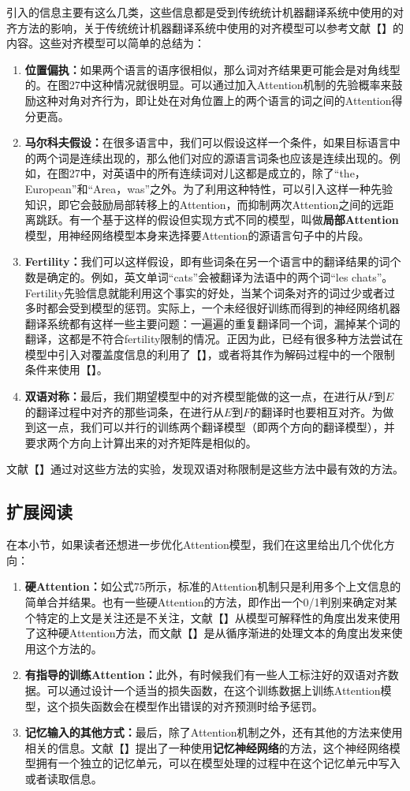 \documentclass[10pt,a4paper]{ctexart}
\begin{document}
引入的信息主要有这么几类，这些信息都是受到传统统计机器翻译系统中使用的对齐方法的影响，关于传统统计机器翻译系统中使用的对齐模型可以参考文献【】的内容。这些对齐模型可以简单的总结为：
\begin{enumerate}
\item[] \textbf{位置偏执：}如果两个语言的语序很相似，那么词对齐结果更可能会是对角线型的。在图27中这种情况就很明显。可以通过加入Attention机制的先验概率来鼓励这种对角对齐行为，即让处在对角位置上的两个语言的词之间的Attention得分更高。
\item[] \textbf{马尔科夫假设：}在很多语言中，我们可以假设这样一个条件，如果目标语言中的两个词是连续出现的，那么他们对应的源语言词条也应该是连续出现的。例如，在图27中，对英语中的所有连续词对儿这都是成立的，除了“the，European”和“Area，was”之外。为了利用这种特性，可以引入这样一种先验知识，即它会鼓励局部转移上的Attention，而抑制两次Attention之间的远距离跳跃。有一个基于这样的假设但实现方式不同的模型，叫做\textbf{局部Attention}模型，用神经网络模型本身来选择要Attention的源语言句子中的片段。
\item[] \textbf{Fertility：}我们可以这样假设，即有些词条在另一个语言中的翻译结果的词个数是确定的。例如，英文单词“cats”会被翻译为法语中的两个词“les chats”。Fertility先验信息就能利用这个事实的好处，当某个词条对齐的词过少或者过多时都会受到模型的惩罚。实际上，一个未经很好训练而得到的神经网络机器翻译系统都有这样一些主要问题：一遍遍的重复翻译同一个词，漏掉某个词的翻译，这都是不符合fertility限制的情况。正因为此，已经有很多种方法尝试在模型中引入对覆盖度信息的利用了【】，或者将其作为解码过程中的一个限制条件来使用【】。
\item[] \textbf{双语对称：}最后，我们期望模型中的对齐模型能做的这一点，在进行从$F$到$E$的翻译过程中对齐的那些词条，在进行从$E$到$F$的翻译时也要相互对齐。为做到这一点，我们可以并行的训练两个翻译模型（即两个方向的翻译模型），并要求两个方向上计算出来的对齐矩阵是相似的。
\end{enumerate}
文献【】通过对这些方法的实验，发现双语对称限制是这些方法中最有效的方法。

\subsection{扩展阅读}
在本小节，如果读者还想进一步优化Attention模型，我们在这里给出几个优化方向：
\begin{enumerate}
\item[] \textbf{硬Attention：}如公式75所示，标准的Attention机制只是利用多个上文信息的简单合并结果。也有一些硬Attention的方法，即作出一个0/1判别来确定对某个特定的上文是关注还是不关注，文献【】从模型可解释性的角度出发来使用了这种硬Attention方法，而文献【】是从循序渐进的处理文本的角度出发来使用这个方法的。
\item[] \textbf{有指导的训练Attention：}此外，有时候我们有一些人工标注好的双语对齐数据。可以通过设计一个适当的损失函数，在这个训练数据上训练Attention模型，这个损失函数会在模型作出错误的对齐预测时给予惩罚。
\item[] \textbf{记忆输入的其他方式：}最后，除了Attention机制之外，还有其他的方法来使用相关的信息。文献【】提出了一种使用\textbf{记忆神经网络}的方法，这个神经网络模型拥有一个独立的记忆单元，可以在模型处理的过程中在这个记忆单元中写入或者读取信息。
\end{enumerate}
\end{document}
